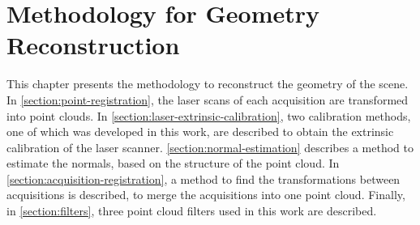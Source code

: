 \chapter{Methodology for Geometry Reconstruction}

This chapter presents the methodology to reconstruct the geometry of the scene. In \cref{section:point-registration}, the laser scans of each acquisition are transformed into point clouds. In \cref{section:laser-extrinsic-calibration}, two calibration methods, one of which was developed in this work, are described to obtain the extrinsic calibration of the laser scanner. \cref{section:normal-estimation} describes a method to estimate the normals, based on the structure of the point cloud. In \cref{section:acquisition-registration}, a method to find the transformations between acquisitions is described, to merge the acquisitions into one point cloud. Finally, in \cref{section:filters}, three point cloud filters used in this work are described.






